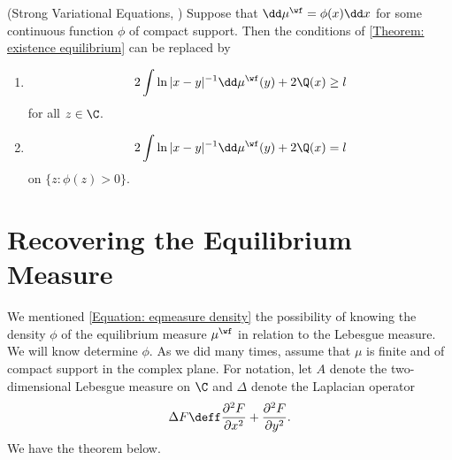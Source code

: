 \begin{teorema} (Strong Variational Equations, \cite{deiftorthogonal})
	Suppose that $\dd \mu^\wf = \phi(x) \dd x$ for some continuous function $\phi$ of compact support. Then the conditions of \autoref{Theorem: existence equilibrium} can be replaced by
	\begin{enumerate}
		\item
		\begin{equation}
			2 \int \ln{|x-y|^{-1}} \dd \mu^\wf(y) + 2 \Q(x) \geq l
		\end{equation}
		for all $z \in \C$.
		\item
		\begin{equation}
			2 \int \ln{|x-y|^{-1}} \dd \mu^\wf(y) + 2 \Q(x) = l
		\end{equation}
		on $\{z : \phi(z) > 0\}$.
	\end{enumerate}
\end{teorema} 


\section{Recovering the Equilibrium Measure}

We mentioned \autoref{Equation: eqmeasure density} the possibility of knowing the density $\phi$ of the equilibrium measure $\mu^\wf$ in relation to the Lebesgue measure. We will know determine $\phi$. As we did many times, assume that $\mu$ is finite and of compact support in the complex plane. For notation, let $A$ denote the two-dimensional Lebesgue measure on $\C$ and $\Delta$ denote the Laplacian operator
\begin{equation}
	\Delta F \deff \frac{\partial^2 F}{\partial x^2} + \frac{\partial^2 F}{\partial y^2}.
\end{equation}
We have the theorem below.

